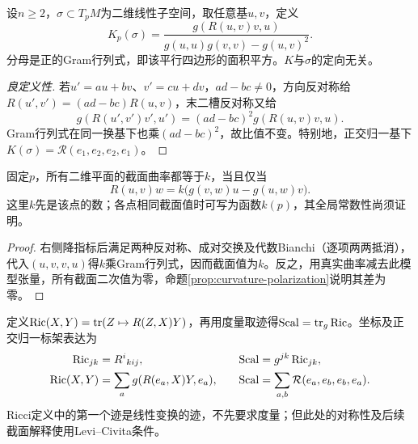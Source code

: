 \begin{definition}[截面曲率]\label{def:sectional-curvature}
设$n\geq2$，$\sigma\subset T_pM$为二维线性子空间，取任意基$u,v$，定义
\[
 K_p(\sigma)=\frac{g(R(u,v)v,u)}{g(u,u)g(v,v)-g(u,v)^2}.
\]
分母是正的Gram行列式，即该平行四边形的面积平方。$K$与$\sigma$的定向无关。
\end{definition}
\begin{proof}[良定义性]
若$u'=au+bv$、$v'=cu+dv$，$ad-bc\ne0$，方向反对称给$R(u',v')=(ad-bc)R(u,v)$，末二槽反对称又给
\[
 g(R(u',v')v',u')=(ad-bc)^2g(R(u,v)v,u).
\]
Gram行列式在同一换基下也乘$(ad-bc)^2$，故比值不变。特别地，正交归一基下$K(\sigma)=\mathcal R(e_1,e_2,e_2,e_1)$。
\end{proof}

\begin{proposition}[常截面值的代数公式]\label{prop:constant-curvature-model}
固定$p$，所有二维平面的截面曲率都等于$k$，当且仅当
\[
 R(u,v)w=k\bigl(g(v,w)u-g(u,w)v\bigr).
\]
这里$k$先是该点的数；各点相同截面值时可写为函数$k(p)$，其全局常数性尚须证明。
\end{proposition}
\begin{proof}
右侧降指标后满足两种反对称、成对交换及代数Bianchi（逐项两两抵消），代入$(u,v,v,u)$得$k$乘Gram行列式，因而截面值为$k$。反之，用真实曲率减去此模型张量，所有截面二次值为零，命题\ref{prop:curvature-polarization}说明其差为零。
\end{proof}

\begin{definition}[Ricci曲率与标量曲率]\label{def:ricci-scalar}
定义$\operatorname{Ric}(X,Y)=\operatorname{tr}(Z\mapsto R(Z,X)Y)$，再用度量取迹得$\mathrm{Scal}=\operatorname{tr}_g\operatorname{Ric}$。坐标及正交归一标架表达为
\begin{align*}
 \Ric_{jk}&=R^i{}_{kij},&\quad \mathrm{Scal}&=g^{jk}\Ric_{jk},\\
 \Ric(X,Y)&=\sum_a g(R(e_a,X)Y,e_a),&
 \mathrm{Scal}&=\sum_{a,b}\mathcal R(e_a,e_b,e_b,e_a).
\end{align*}
Ricci定义中的第一个迹是线性变换的迹，不先要求度量；但此处的对称性及后续截面解释使用Levi--Civita条件。
\end{definition}

